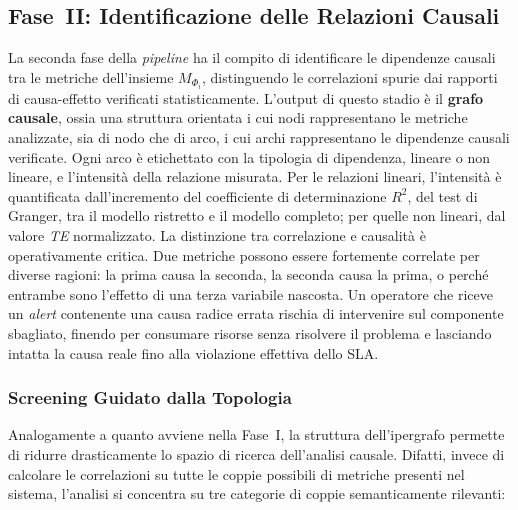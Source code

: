 \subsection{Fase~II: Identificazione delle Relazioni Causali}
\label{sec:fase_2}

La seconda fase della \textit{pipeline} ha il compito di identificare le dipendenze causali tra le
metriche dell'insieme $M_{\Phi_i}$, distinguendo le correlazioni spurie dai rapporti di causa-effetto
verificati statisticamente. L'output di questo stadio è il \textbf{grafo causale}, ossia una
struttura orientata i cui nodi rappresentano le metriche analizzate, sia di nodo che di arco, i cui
archi rappresentano le dipendenze causali verificate. Ogni arco è etichettato con la tipologia di
dipendenza, lineare o non lineare, e l'intensità della relazione misurata. Per le relazioni lineari,
l'intensità è quantificata dall'incremento del coefficiente di determinazione $R^2$, del test di
Granger, tra il modello ristretto e il modello completo; per quelle non lineari, dal valore
\textit{TE} normalizzato. La distinzione tra correlazione e causalità è operativamente critica.
Due metriche possono essere fortemente correlate per diverse ragioni: la prima causa la seconda, la
seconda causa la prima, o perché entrambe sono l'effetto di una terza variabile nascosta. Un
operatore che riceve un \textit{alert} contenente una causa radice errata rischia di intervenire
sul componente sbagliato, finendo per consumare risorse senza risolvere il problema e lasciando
intatta la causa reale fino alla violazione effettiva dello \gls{SLA}.

\subsubsection{Screening Guidato dalla Topologia}
\label{sec:screening_topologia}

Analogamente a quanto avviene nella Fase~I, la struttura dell'ipergrafo permette di ridurre
drasticamente lo spazio di ricerca dell'analisi causale. Difatti, invece di calcolare le
correlazioni su tutte le coppie possibili di metriche presenti nel sistema, l'analisi si concentra
su tre categorie di coppie semanticamente rilevanti:

